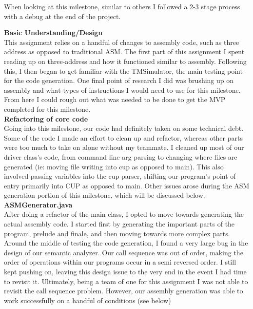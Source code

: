 \documentclass[12pt]{extarticle}
\begin{document}
When looking at this milestone, similar to others I followed a 2-3 stage process with a debug at the end of the project.

\textbf{Basic Understanding/Design} \\
This assignment relies on a handful of changes to assembly code, such as three address as opposed to traditional ASM. The first part of this assignment I spent reading up on three-address and how it functioned similar to assembly. Following this, I then began to get familiar with the TMSimulator, the main testing point for the code generation. One final point of research I did was brushing up on assembly and what types of instructions I would need to use for this milestone. From here I could rough out what was needed to be done to get the MVP completed for this milestone. \\

\noindent \textbf{Refactoring of core code} \\
Going into this milestone, our code had definitely taken on some technical debt. Some of the code I made an effort to clean up and refactor, whereas other parts were too much to take on alone without my teammate. I cleaned up most of our driver class's code, from command line arg parsing to changing where files are generated (ie: moving file writing into cup as opposed to main). This also involved passing variables into the cup parser, shifting our program's point of entry primarily into CUP as opposed to main. Other issues arose during the ASM generation portion of this milestone, which will be discussed below. \\


\textbf{ASMGenerator.java} \\
After doing a refactor of the main class, I opted to move towards generating the actual assembly code. I started first by generating the important parts of the program, prelude and finale, and then moving towards more complex parts. Around the middle of testing the code generation, I found a very large bug in the design of our semantic analyzer. Our call sequence was out of order, making the order of operations within our programs occur in a semi reversed order. I still kept pushing on, leaving this design issue to the very end in the event I had time to revisit it. Ultimately, being a team of one for this assignment I was not able to revisit the call sequence problem. However, our assembly generation was able to work successfully on a handful of conditions (see below) \\
\end{document}
